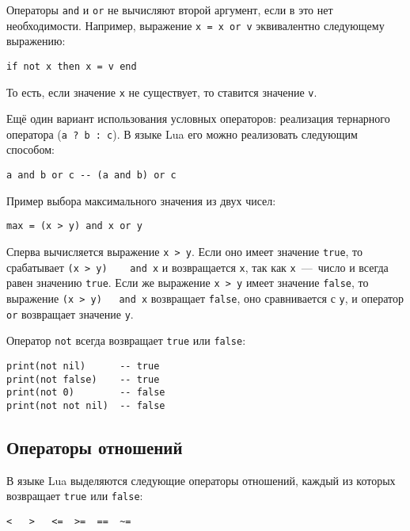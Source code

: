 Операторы \lstinline{and} и \lstinline{or} не вычисляют второй аргумент, если в это нет необходимости.
Например, выражение \lstinline{x = x or v} эквивалентно следующему выражению:

\begin{lstlisting}
if not x then x = v end
\end{lstlisting}

То есть, если значение \lstinline{x} не существует, то ставится значение \lstinline{v}.

Ещё один вариант использования условных операторов: реализация тернарного оператора (\lstinline{a ? b : c}). В языке Lua его можно реализовать следующим способом:

\begin{lstlisting}
a and b or c -- (a and b) or c
\end{lstlisting}

Пример выбора максимального значения из двух чисел:

\begin{lstlisting}
max = (x > y) and x or y
\end{lstlisting}

Сперва вычисляется выражение \lstinline{x > y}. Если оно имеет значение \lstinline{true}, то срабатывает \lstinline{(x > y)    and x} и возвращается \lstinline{x}, так как \lstinline{x}~---~число и всегда равен значению \lstinline{true}. 
Если же выражение  \lstinline{x > y} имеет значение \lstinline{false}, 
то выражение \lstinline{(x > y)   and x} возвращает \lstinline{false}, оно сравнивается с \lstinline{y}, 
и оператор \lstinline{or} возвращает значение \lstinline{y}.

Оператор \lstinline{not} всегда возвращает \lstinline{true} или \lstinline{false}:

\begin{lstlisting}
print(not nil)      -- true
print(not false)    -- true
print(not 0)        -- false
print(not not nil)  -- false
\end{lstlisting}

\subsection{Операторы отношений}

В языке Lua выделяются следующие операторы отношений, каждый из которых возвращает \lstinline{true} или \lstinline{false}:

\begin{lstlisting}
<   >   <=  >=  ==  ~=
\end{lstlisting}


